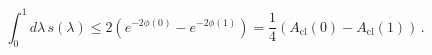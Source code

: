\begin{equation}
\int_0^1 d\lambda\, s(\lambda) \leq 2 \left( e^{-2\phi(0)} - e^{-2\phi(1)}
\right) = \frac{1}{4} \left( A_{\text{cl}}(0) -
A_{\text{cl}}(1)\right) \,
.
\end{equation}

